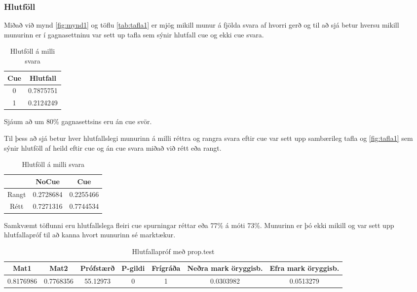 \documentclass[
  10pt,
]{article}
\begin{document}
\newpage

\hypertarget{hlutfuxf6ll}{%
\subsubsection{Hlutföll}\label{hlutfuxf6ll}}

Miðað við mynd \ref{fig:mynd1} og töflu \ref{tab:tafla1} er mjög mikill munur á fjölda svara af hvorri gerð og til að sjá betur hversu mikill munurinn er í gagnasettninu var sett up tafla sem sýnir hlutfall cue og ekki cue svara.

\begin{table}[!h]

\caption{\label{tab:tafla2}\label{tab:strings} Hlutföll á milli svara }
\centering
\begin{tabular}[t]{cc}
\toprule
\textbf{Cue} & \textbf{Hlutfall}\\
\midrule
0 & 0.7875751\\
1 & 0.2124249\\
\bottomrule
\end{tabular}
\end{table}

Sjáum að um 80\% gagnasettsins eru án cue svör.

Til þess að sjá betur hver hlutfallslegi munurinn á milli réttra og rangra svara eftir cue var sett upp sambærileg tafla og \ref{fig:tafla1} sem sýnir hlutföll af heild eftir cue og án cue svara miðað við rétt eða rangt.

\begin{table}[!h]

\caption{\label{tab:unnamed-chunk-3}\label{tab:strings} Hlutföll á milli svara }
\centering
\begin{tabular}[t]{ccc}
\toprule
\textbf{} & \textbf{NoCue} & \textbf{Cue}\\
\midrule
Rangt & 0.2728684 & 0.2255466\\
Rétt & 0.7271316 & 0.7744534\\
\bottomrule
\end{tabular}
\end{table}

Samkvæmt töflunni eru hlutfallslega fleiri cue spurningar réttar eða 77\% á móti 73\%. Munurinn er þó ekki mikill og var sett upp hlutfallapróf til að kanna hvort munurinn sé marktækur.

\begin{table}[!h]

\caption{\label{tab:unnamed-chunk-4}\label{tab:strings} Hlutfallapróf með prop.test}
\centering
\begin{tabular}[t]{ccccccc}
\toprule
\textbf{Mat1} & \textbf{Mat2} & \textbf{Prófstærð} & \textbf{P-gildi} & \textbf{Frígráða} & \textbf{Neðra mark öryggisb.} & \textbf{Efra mark öryggisb.}\\
\midrule
0.8176986 & 0.7768356 & 55.12973 & 0 & 1 & 0.0303982 & 0.0513279\\
\bottomrule
\end{tabular}
\end{table}
\end{document}
